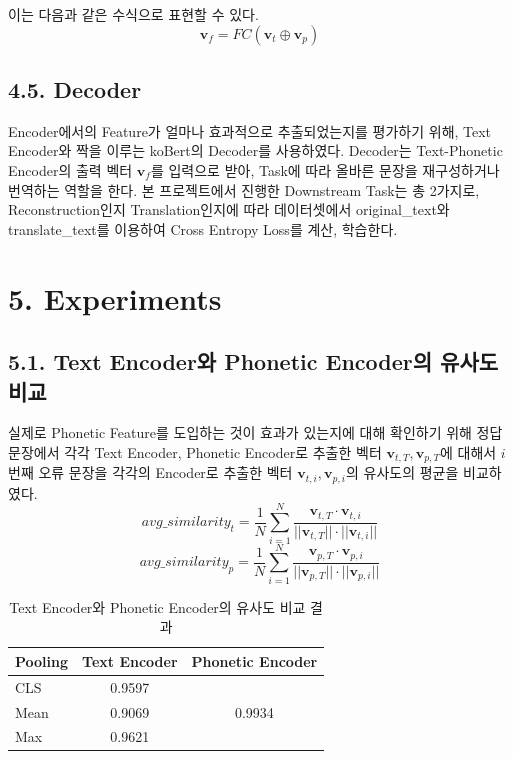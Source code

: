 \documentclass[letterpaper]{article} %
\begin{document}
이는 다음과 같은 수식으로 표현할 수 있다.
\begin{equation}
    \mathbf{v}_f = FC (\mathbf{v}_t \oplus \mathbf{v}_p)
\end{equation}

\subsection{4.5. Decoder}
Encoder에서의 Feature가 얼마나 효과적으로 추출되었는지를 평가하기 위해, Text Encoder와 짝을 이루는 koBert의 Decoder를 사용하였다.
Decoder는 Text-Phonetic Encoder의 출력 벡터 $\mathbf{v}_f$를 입력으로 받아, Task에 따라 올바른 문장을 재구성하거나 번역하는 역할을 한다.
본 프로젝트에서 진행한 Downstream Task는 총 2가지로, Reconstruction인지 Translation인지에 따라 데이터셋에서 original\_text와 translate\_text를 이용하여 Cross Entropy Loss를 계산, 학습한다.

\section{5. Experiments}
\subsection{5.1. Text Encoder와 Phonetic Encoder의 유사도 비교}
실제로 Phonetic Feature를 도입하는 것이 효과가 있는지에 대해 확인하기 위해 정답 문장에서 각각 Text Encoder, Phonetic Encoder로 추출한 벡터 $\mathbf{v}_{t,T}, \mathbf{v}_{p,T}$에 대해서 $i$번째 오류 문장을 각각의 Encoder로 추출한 벡터 $\mathbf{v}_{t,i}, \mathbf{v}_{p,i}$의 유사도의 평균을 비교하였다.
\begin{equation}
    avg\_similarity_{t} = \frac{1}{N} \sum_{i=1}^{N} \frac{\mathbf{v}_{t,T} \cdot \mathbf{v}_{t,i}}{||\mathbf{v}_{t,T}|| \cdot ||\mathbf{v}_{t,i}||}
\end{equation}
\begin{equation}
    avg\_similarity_{p} = \frac{1}{N} \sum_{i=1}^{N} \frac{\mathbf{v}_{p,T} \cdot \mathbf{v}_{p,i}}{||\mathbf{v}_{p,T}|| \cdot ||\mathbf{v}_{p,i}||}
\end{equation}
\begin{table}[ht]
    \centering
    \begin{tabular}{lcc}
        Pooling & \multicolumn{1}{l}{Text Encoder} & \multicolumn{1}{l}{Phonetic Encoder} \\ \hline
        CLS     & 0.9597                           &                                      \\
        Mean    & 0.9069                           & 0.9934                               \\
        Max     & 0.9621                           &
    \end{tabular}
    \caption{Text Encoder와 Phonetic Encoder의 유사도 비교 결과}
    \label{tab:encoder_comparison}
\end{table}
\end{document}
